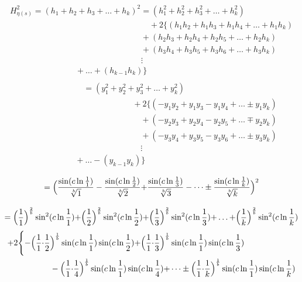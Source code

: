 \documentclass{amsart}
\begin{document}
	\[\]
	\[\]
	\[ \begin{array}{c}
		H_{\eta(s)}^2 = (h_1 {+} h_2 {+} h_3 {+} \dots {+} h_k)^2 = (h_1^2 {+} h_2^2 {+} h_3^2 {+} \dots {+} h_k^2) \\
		\qquad\qquad\qquad\qquad\qquad\qquad\qquad\qquad\quad {+} 2\{(h_1h_2 {+} h_1h_3 {+} h_1h_4 {+} \dots {+} h_{1}h_{k}) \\ 
		\qquad\qquad\qquad\qquad\qquad\qquad\qquad\qquad {+} (h_2h_3 {+} h_2h_4 {+} h_2h_5 {+} \dots {+} h_2h_{k}) \\ 
		\qquad\qquad\qquad\qquad\qquad\qquad\qquad\qquad {+} (h_3h_4 {+} h_3h_5 {+} h_3h_6 {+} \dots {+} h_3h_{k}) \\ 
		\qquad\qquad\qquad\qquad\qquad\qquad\qquad\qquad \vdots \\
		\qquad\qquad\qquad\qquad {+} \dots {+} (h_{k-1}h_{k}) \} \\ 
	\end{array} \]
	\[ \begin{array}{c}
		\qquad\qquad\qquad\quad = (y_1^2 {+} y_2^2 {+} y_3^2 {+} \dots {+} y_k^2) \\ 
		\qquad\qquad\qquad\qquad\qquad\qquad\quad {+} 2\{(-y_1y_2 {+} y_1y_3 - y_1y_4 {+} \dots \pm y_{1}y_{k}) \\ 
		\qquad\qquad\qquad\qquad\qquad\qquad\qquad {+} (-y_2y_3 {+} y_2y_4 - y_2y_5 {+} \dots \mp y_{2}y_{k}) \\ 
		\qquad\qquad\qquad\qquad\qquad\qquad\qquad {+} (-y_3y_4 {+} y_3y_5 - y_3y_6 {+} \dots \pm y_{3}y_{k}) \\ 
		\qquad\qquad\qquad\qquad\qquad\qquad\qquad \vdots \\
		\qquad\qquad\qquad {+} \dots - (y_{k-1}y_{k}) \} \\
	\end{array} \]
	\[\]
	\[\]
	\[ = \Bigl( \frac{\sin({c\ln \frac{1}{1}})}{\sqrt[b]{1}} - \frac{\sin({c\ln \frac{1}{2}})}{\sqrt[b]{2}} {+} \frac{\sin({c\ln \frac{1}{3}})}{\sqrt[b]{3}} - \dots \pm \frac{\sin({c\ln \frac{1}{k}})}{\sqrt[b]{k}} \Bigr)^2 \]
	\[\]
	\[\]
	\[ = \Bigl( \frac{1}{1} \Bigr)^{\frac2b}\sin^2({c \ln \frac{1}{1}}) {+} \Bigl( \frac{1}{2} \Bigr)^{\frac2b}\sin^2({c \ln \frac{1}{2}}) {+} \Bigl( \frac{1}{3} \Bigr)^{\frac2b}\sin^2({c \ln \frac{1}{3}}) {+} \dots {+} \Bigl( \frac{1}{k} \Bigr)^{\frac2b}\sin^2({c \ln \frac{1}{k}}) \]
	\[
	\begin{aligned}
		{+}2\Biggl\{ -\Bigl( \frac{1}{1} {\cdot} \frac{1}{2}& \Bigr)^\frac1b \sin(c \ln \frac{1}{1}) \sin(c \ln \frac{1}{2}) {+} \Bigl( \frac{1}{1} {\cdot} \frac{1}{3} \Bigr)^\frac1b \sin(c \ln \frac{1}{1}) \sin(c \ln \frac{1}{3}) \\ 
		& - \Bigl( \frac{1}{1} {\cdot} \frac{1}{4} \Bigr)^\frac1b \sin(c \ln \frac{1}{1}) \sin(c \ln \frac{1}{4}) {+} \dots \pm \Bigl( \frac{1}{1} {\cdot} \frac{1}{k} \Bigr)^\frac1b \sin(c \ln \frac{1}{1}) \sin(c \ln \frac{1}{k}) \\ 		
	\end{aligned}
	\]
\end{document}
